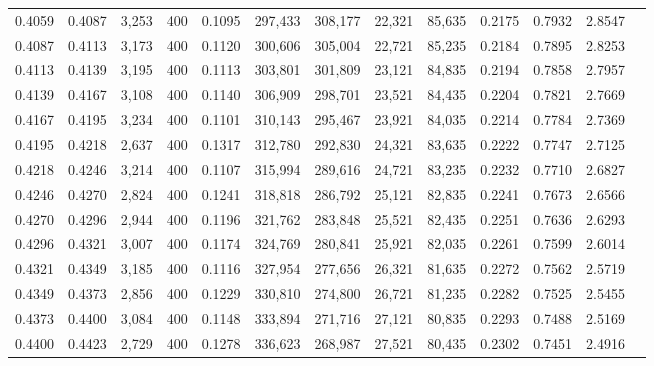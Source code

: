\begin{tabular}{rrrrrrrrrrrrr}
0.4059 & 0.4087 &  3,253 & 400 &                                     0.1095 & 297,433 & 308,177 &  22,321 &  85,635 & 0.2175 & 0.7932 & 2.8547 \\
0.4087 & 0.4113 &  3,173 & 400 &                                     0.1120 & 300,606 & 305,004 &  22,721 &  85,235 & 0.2184 & 0.7895 & 2.8253 \\
0.4113 & 0.4139 &  3,195 & 400 &                                     0.1113 & 303,801 & 301,809 &  23,121 &  84,835 & 0.2194 & 0.7858 & 2.7957 \\
0.4139 & 0.4167 &  3,108 & 400 &                                     0.1140 & 306,909 & 298,701 &  23,521 &  84,435 & 0.2204 & 0.7821 & 2.7669 \\
0.4167 & 0.4195 &  3,234 & 400 &                                     0.1101 & 310,143 & 295,467 &  23,921 &  84,035 & 0.2214 & 0.7784 & 2.7369 \\
0.4195 & 0.4218 &  2,637 & 400 &                                     0.1317 & 312,780 & 292,830 &  24,321 &  83,635 & 0.2222 & 0.7747 & 2.7125 \\
0.4218 & 0.4246 &  3,214 & 400 &                                     0.1107 & 315,994 & 289,616 &  24,721 &  83,235 & 0.2232 & 0.7710 & 2.6827 \\
0.4246 & 0.4270 &  2,824 & 400 &                                     0.1241 & 318,818 & 286,792 &  25,121 &  82,835 & 0.2241 & 0.7673 & 2.6566 \\
0.4270 & 0.4296 &  2,944 & 400 &                                     0.1196 & 321,762 & 283,848 &  25,521 &  82,435 & 0.2251 & 0.7636 & 2.6293 \\
0.4296 & 0.4321 &  3,007 & 400 &                                     0.1174 & 324,769 & 280,841 &  25,921 &  82,035 & 0.2261 & 0.7599 & 2.6014 \\
0.4321 & 0.4349 &  3,185 & 400 &                                     0.1116 & 327,954 & 277,656 &  26,321 &  81,635 & 0.2272 & 0.7562 & 2.5719 \\
0.4349 & 0.4373 &  2,856 & 400 &                                     0.1229 & 330,810 & 274,800 &  26,721 &  81,235 & 0.2282 & 0.7525 & 2.5455 \\
0.4373 & 0.4400 &  3,084 & 400 &                                     0.1148 & 333,894 & 271,716 &  27,121 &  80,835 & 0.2293 & 0.7488 & 2.5169 \\
0.4400 & 0.4423 &  2,729 & 400 &                                     0.1278 & 336,623 & 268,987 &  27,521 &  80,435 & 0.2302 & 0.7451 & 2.4916 \\

\end{tabular}
